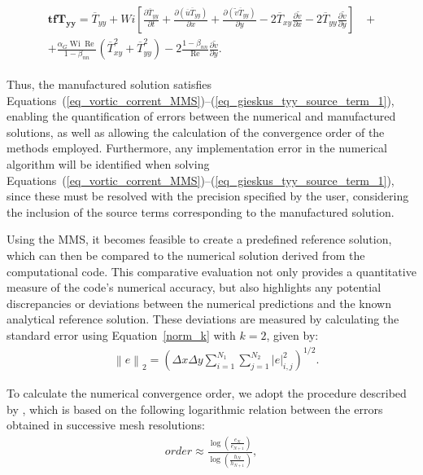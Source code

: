 \documentclass[preprint, 12pt]{elsarticle}
\begin{document}
\begin{gather}
    \begin{aligned}
        \mathbf{tfT_{yy}} = \overline{T}_{yy} + Wi\left[\frac{\partial \overline{T}_{yy}}{\partial t} + \frac{\partial (\overline{u}\overline{T}_{yy})}{\partial x} + \frac{\partial(\widetilde{v}\overline{T}_{yy})}{\partial y} - 2\overline{T}_{xy}\frac{\partial\widetilde{v}}{\partial x} - 2\overline{T}_{yy}\frac{\partial\widetilde{v}}{\partial y}\right] &~+ \\ + \frac{\alpha_{G}\operatorname{Wi}\operatorname{Re}}{1-\beta_{nn}}\left(\overline{T}_{xy}^{2} + \overline{T}_{yy}^{2}\right) - 2\frac{1-\beta_{nn}}{\operatorname{Re}}\frac{\partial\widetilde{v}}{\partial y}.\label{eq_tyy_s_t_2}
    \end{aligned}
\end{gather}

Thus, the manufactured solution satisfies Equations~(\ref{eq_vortic_corrent_MMS})--(\ref{eq_gieskus_tyy_source_term_1}), enabling the quantification of errors between the numerical and manufactured solutions, as well as allowing the calculation of the convergence order of the methods employed. Furthermore, any implementation error in the numerical algorithm will be identified when solving Equations~(\ref{eq_vortic_corrent_MMS})--(\ref{eq_gieskus_tyy_source_term_1}), since these must be resolved with the precision specified by the user, considering the inclusion of the source terms corresponding to the manufactured solution.

Using the MMS, it becomes feasible to create a predefined reference solution, which can then be compared to the numerical solution derived from the computational code. This comparative evaluation not only provides a quantitative measure of the code's numerical accuracy, but also highlights any potential discrepancies or deviations between the numerical predictions and the known analytical reference solution. These deviations are measured by calculating the standard error using Equation~\eqref{norm_k} with $k = 2$, given by:
\begin{align}
    &\left \|e\right \|_{2}=\left(\Delta x \Delta y \sum_{i=1}^{N_{1}}\sum_{j=1}^{N_{2}} \left |e\right |_{i,j}^{2}\right)^{1/2}.\label{norm_k_equal_2}
\end{align}

To calculate the numerical convergence order, we adopt the procedure described by \citet{leveque2007finite}, which is based on the following logarithmic relation between the errors obtained in successive mesh resolutions:
\begin{align}
    order \approx \frac{\log\left(\frac{e_{N}}{e_{N+1}}\right)}{\log\left(\frac{h_{N}}{h_{N+1}}\right)},\label{log_p}
\end{align}
\end{document}
